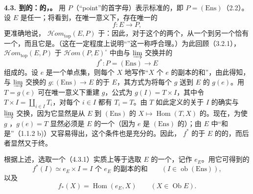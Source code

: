 \textbf{4.3. 到的：的，。} 用 $P$（“point”的首字母）表示标准的，即 $P=(\mathrm{Ens})$（2.2）。设 $E$ 是任一；将看到，在唯一意义下，存在唯一的
\[
 f:E\longrightarrow P,\tag{4.3.1}
\]
更准确地说， $\mathscr Hom_{\mathrm{top}}(E,P)$ 于：因此，对于这个的两个，从一个到另一个恰有一个，而且它是。（这在一定程度上说明“”这一称呼合理。）为此回顾（3.2.1），$\mathscr Hom_{\mathrm{top}}(E,P)$ 于
$\mathscr Hom(P,E)^\circ$ 中由与 $\varinjlim$ 交换并的
\[
 f^*:P=(\mathrm{Ens})\longrightarrow E
\]
组成的。设 $e$ 是一个单点集，则每个 $X$ 地写作“$X$ 个 $e$ 的副本的和”，由此得知，与 $\varinjlim$ 交换的 $g:(\mathrm{Ens})\to E$ 的于 $E$，其方式为将每个 $g$ 送到 $E$ 的 $g(e)$。用 $T=g(e)$ 可在唯一意义下重建 $g$，公式为 $g(I)=T\times I$，其中令 $T\times I=\coprod_{i\in I}T_i$，对每个 $i\in I$ 都有 $T_i=T$。由 $T$ 如此定义的关于 $I$ 的确实与 $\varinjlim$ 交换，因为它显然是从 $E$ 到 $(\mathrm{Ens})$ 的 $X\mapsto\operatorname{Hom}(T,X)$ 的。现在，为使 $g$ ，$g(e)=T$ 显然必须是 $E$ 的一个（因为 $e$ 是 $(\mathrm{Ens})$ 的）；由 $E$ 中“和是”（1.1.2 b)）又容易得出，这个条件也是充分的。因此， $f^*$ 的于 $E$ 的的，而后者显然又于终。

根据上述，选取一个（4.3.1）实质上等于选取 $E$ 的一个，记作 $e_E$。用它可得到的
\[
 f^*(I)\simeq e_E\times I=I\text{ 个 }e_E\text{ 的副本的和}\qquad(I\in\operatorname{ob}(\mathrm{Ens})),\tag{4.3.2}
\]
以及
\[
 f_*(X)=\operatorname{Hom}(e_E,X)\qquad(X\in\operatorname{Ob}E).\tag{4.3.3}
\]

